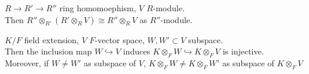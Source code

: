 \begin{proposition}[Property D]
     $ R\rightarrow R'\rightarrow R'' $ ring homomoephism,  $ V  $  $ R $-module.\\
     Then  $ R''\otimes _{R'}(R'\otimes_R V)\cong R''\otimes_R V $ as  $ R'' $-module.   
\end{proposition}
\begin{proposition}[Property E]
     $ K/F $ field extension,  $ V  $  $ F  $-vector space,  $ W,W'\subset V $ subspace.\\
     Then the inclusion map  $ W\hookrightarrow V $ induces  $ K\otimes_F W\hookrightarrow K\otimes _F V  $ is injective.\\
     Moreover, if  $ W\not= W'   $ as subspace of  $ V  $,  $ K\otimes_F W\not=K\otimes_F W'$ as subspace of  $ K\otimes_F V$   
\end{proposition}
